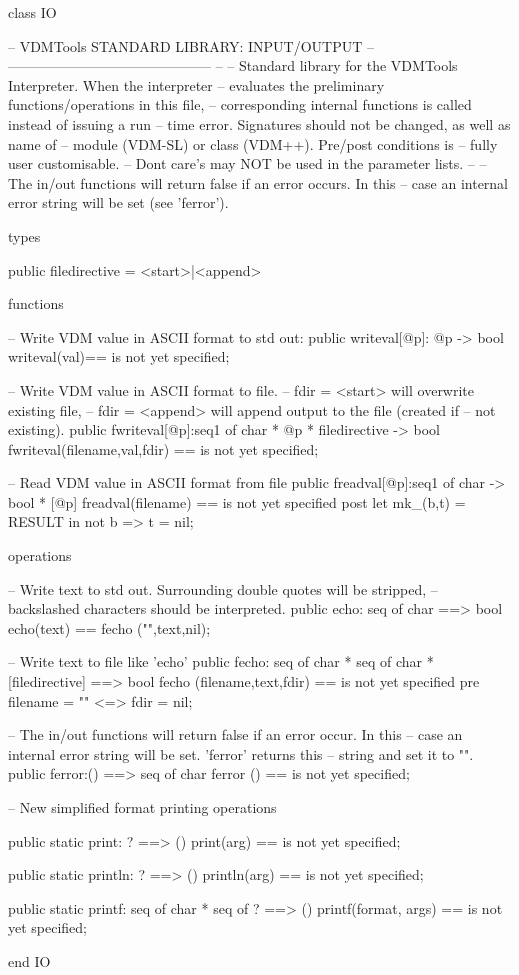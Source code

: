 \documentclass[a4paper]{article}
\begin{document}
\title{}
\author{}
\begin{vdm_al}
class IO

--  VDMTools STANDARD LIBRARY: INPUT/OUTPUT
--      --------------------------------------------
-- 
-- Standard library for the VDMTools Interpreter. When the interpreter
-- evaluates the preliminary functions/operations in this file,
-- corresponding internal functions is called instead of issuing a run
-- time error. Signatures should not be changed, as well as name of
-- module (VDM-SL) or class (VDM++). Pre/post conditions is 
-- fully user customisable. 
-- Dont care's may NOT be used in the parameter lists.
--
-- The in/out functions  will return false if an error occurs. In this
-- case an internal error string will be set (see 'ferror').

types
 
public
filedirective = <start>|<append> 

functions

-- Write VDM value in ASCII format to std out:
public
writeval[@p]: @p -> bool
writeval(val)==
  is not yet specified;

-- Write VDM value in ASCII format to file.
-- fdir = <start> will overwrite existing file,
-- fdir = <append> will append output to the file (created if
-- not existing).
public
fwriteval[@p]:seq1 of char * @p * filedirective -> bool
fwriteval(filename,val,fdir) ==
  is not yet specified;

-- Read VDM value in ASCII format from file
public
freadval[@p]:seq1 of char -> bool * [@p]
freadval(filename) ==
  is not yet specified
  post let mk_(b,t) = RESULT in not b => t = nil;

operations

-- Write text to std out. Surrounding double quotes will be stripped,
-- backslashed characters should be interpreted.
public
echo: seq of char ==> bool
echo(text) ==
  fecho ("",text,nil);

-- Write text to file like 'echo'
public
fecho: seq of char * seq of char * [filedirective] ==> bool
fecho (filename,text,fdir) ==
  is not yet specified
  pre filename = "" <=> fdir = nil;

-- The in/out functions  will return false if an error occur. In this
-- case an internal error string will be set. 'ferror' returns this
-- string and set it to "".
public
ferror:()  ==> seq of char
ferror () ==
  is not yet specified;
  
-- New simplified format printing operations

public static print: ? ==> ()
print(arg) ==
 is not yet specified;

public static println: ? ==> ()
println(arg) ==
 is not yet specified;

public static printf: seq of char * seq of ? ==> ()
printf(format, args) ==
 is not yet specified;

end IO
\end{vdm_al}
\end{document}
